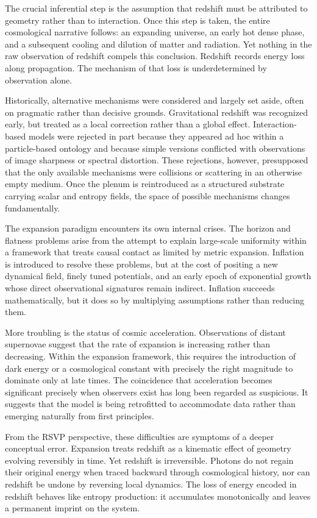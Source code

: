 \documentclass[11pt,oneside]{book}
\begin{document}
The crucial inferential step is the assumption that redshift must be attributed to geometry rather than to interaction. Once this step is taken, the entire cosmological narrative follows: an expanding universe, an early hot dense phase, and a subsequent cooling and dilution of matter and radiation. Yet nothing in the raw observation of redshift compels this conclusion. Redshift records energy loss along propagation. The mechanism of that loss is underdetermined by observation alone.

Historically, alternative mechanisms were considered and largely set aside, often on pragmatic rather than decisive grounds. Gravitational redshift was recognized early, but treated as a local correction rather than a global effect. Interaction-based models were rejected in part because they appeared ad hoc within a particle-based ontology and because simple versions conflicted with observations of image sharpness or spectral distortion. These rejections, however, presupposed that the only available mechanisms were collisions or scattering in an otherwise empty medium. Once the plenum is reintroduced as a structured substrate carrying scalar and entropy fields, the space of possible mechanisms changes fundamentally.

The expansion paradigm encounters its own internal crises. The horizon and flatness problems arise from the attempt to explain large-scale uniformity within a framework that treats causal contact as limited by metric expansion. Inflation is introduced to resolve these problems, but at the cost of positing a new dynamical field, finely tuned potentials, and an early epoch of exponential growth whose direct observational signatures remain indirect. Inflation succeeds mathematically, but it does so by multiplying assumptions rather than reducing them.

More troubling is the status of cosmic acceleration. Observations of distant supernovae suggest that the rate of expansion is increasing rather than decreasing. Within the expansion framework, this requires the introduction of dark energy or a cosmological constant with precisely the right magnitude to dominate only at late times. The coincidence that acceleration becomes significant precisely when observers exist has long been regarded as suspicious. It suggests that the model is being retrofitted to accommodate data rather than emerging naturally from first principles.

From the RSVP perspective, these difficulties are symptoms of a deeper conceptual error. Expansion treats redshift as a kinematic effect of geometry evolving reversibly in time. Yet redshift is irreversible. Photons do not regain their original energy when traced backward through cosmological history, nor can redshift be undone by reversing local dynamics. The loss of energy encoded in redshift behaves like entropy production: it accumulates monotonically and leaves a permanent imprint on the system.
\end{document}
